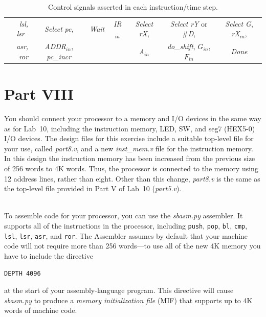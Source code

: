 \documentclass[epsfig,10pt,fullpage]{article} \addtolength{\textwidth}{1.5in}
\begin{document}
\begin{table}[H]
\begin{center}
\begin{tabular}{r|c|c|c|c|c|c|}
\cline{2-7}
\rule[-0.075in]{0in}{0.25in}{\it lsl, lsr~} & {\it Select} {\it pc}, &  {\it Wait} & {\it IR}$_{in}$ & {\it Select} {\it rX}, & {\it Select} {\it rY} or \#{\it D}, & {\it Select G}, {\it rX$_{in}$}, \\
{\it asr, ror} & {\it ADDR}$_{in}$, {\it pc\_incr} & {\it ~} & ~ & {\it A$_{in}$} & {\it do\_shift}, $G_{in}$, $F_{in}$ & {\it Done} \\
\cline{2-7}
\end{tabular}
\caption{Control signals asserted in each instruction/time step.}
\label{tab:control_signals}
\end{center}
\end{table}

\section*{Part VIII}

You should connect your processor to a memory and I/O devices in the same way as for
Lab~10, including the instruction memory, LED, SW, and seg7 (HEX5-0) I/O devices. 
The design files for this exercise include a suitable top-level file for your use, 
called {\it part8.v}, and a new {\it inst\_mem.v} file for the instruction memory. In 
this design the instruction memory has been increased from the previous size 
of 256 words to 4K words. Thus, the processor is
connected to the memory using 12 address lines, rather than eight. Other than this
change, {\it part8.v} is the same as the top-level file provided in Part V of Lab~10
({\it part5.v}).

~\\
\noindent
To assemble code for your processor, you can use the {\it sbasm.py}
assembler. It supports all of the instructions in the processor, 
including \texttt{push}, \texttt{pop}, \texttt{bl}, \texttt{cmp}, \texttt{lsl}, 
\texttt{lsr}, \texttt{asr}, and \texttt{ror}.
The Assembler assumes by default that your machine code will not require more than 
256 words---to use all of the new 4K memory you have to include the directive
\begin{verbatim}
DEPTH 4096
\end{verbatim}
at the start of your assembly-language program. This directive will cause 
{\it sbasm.py} to produce a
{\it memory initialization file} (MIF) that supports up to 4K words of machine code. 
\end{document}
